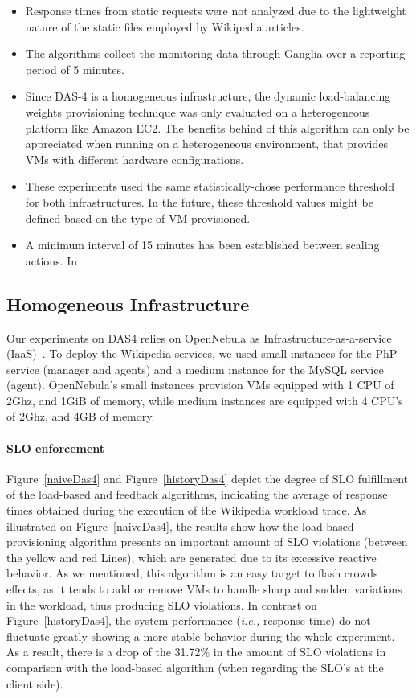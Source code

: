 \begin{itemize}
\item  Response times from static requests were not analyzed due to the lightweight nature of the static files employed by Wikipedia articles. 

\item The algorithms collect the monitoring data through Ganglia over a reporting period of 5 minutes.

\item Since DAS-4 is a homogeneous infrastructure, the dynamic load-balancing weights provisioning technique was only evaluated on a heterogeneous platform like Amazon EC2. The benefits behind of this algorithm can only be appreciated when running on a heterogeneous environment, that provides VMs with different hardware configurations. 

\item These experiments used the same statistically-chose performance threshold for both infrastructures. In the future, these threshold values might be defined based on the type of VM provisioned. 

\item A minimum interval of 15 minutes has been established between scaling actions. In
\end{itemize}
\subsection*{Homogeneous Infrastructure}

Our experiments on DAS4 relies on OpenNebula as Infrastructure-as-a-service (IaaS)~\cite{sotomayor_virtual_2009}. To deploy the Wikipedia services, we used small instances for the PhP service (manager and agents) and a medium instance for the MySQL service (agent). OpenNebula's small instances provision VMs equipped with 1 CPU of 2Ghz, and 1GiB of memory, while medium instances are equipped with 4 CPU's of 2Ghz, and 4GB of memory.

\paragraph{SLO enforcement}
Figure~\ref{naiveDas4} and Figure~\ref{historyDas4} depict the degree of SLO fulfillment of the load-based and feedback algorithms, indicating the average of response times obtained during the execution of the Wikipedia workload trace. As illustrated on Figure~\ref{naiveDas4}, the results show how the load-based provisioning algorithm presents an important amount of SLO violations (between the yellow and red Lines), which are generated due to its excessive reactive behavior. As we mentioned, this algorithm is an easy target to flash crowds effects, as it tends to add or remove VMs to handle sharp and sudden variations in the workload, thus producing SLO violations. In contrast on Figure~\ref{historyDas4}, the system performance (\emph{i.e.,} response time) do not fluctuate greatly showing a more stable behavior during the whole experiment. As a result, there is a drop of the 31.72\% in the amount of SLO violations in comparison with the load-based algorithm (when regarding the SLO's at the client side). 


